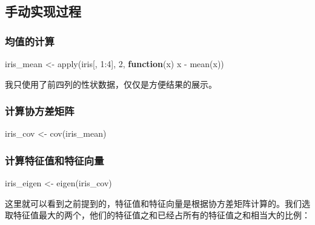 \documentclass[
]{krantz}
\makeatletter
\newenvironment{Shaded}{\begin{snugshade}}{\end{snugshade}}
\newcommand{\ControlFlowTok}[1]{\textcolor[rgb]{0.13,0.29,0.53}{\textbf{#1}}}
\newcommand{\DecValTok}[1]{\textcolor[rgb]{0.00,0.00,0.81}{#1}}
\newcommand{\FunctionTok}[1]{\textcolor[rgb]{0.00,0.00,0.00}{#1}}
\newcommand{\NormalTok}[1]{#1}
\newcommand{\OtherTok}[1]{\textcolor[rgb]{0.56,0.35,0.01}{#1}}
\newcommand{\SpecialCharTok}[1]{\textcolor[rgb]{0.00,0.00,0.00}{#1}}
\newenvironment{kframe}{%
\medskip{}
\setlength{\fboxsep}{.8em}
 \def\at@end@of@kframe{}%
 \ifinner\ifhmode%
  \def\at@end@of@kframe{\end{minipage}}%
  \begin{minipage}{\columnwidth}%
 \fi\fi%
 \def\FrameCommand##1{\hskip\@totalleftmargin \hskip-\fboxsep
 \colorbox{shadecolor}{##1}\hskip-\fboxsep
     \hskip-\linewidth \hskip-\@totalleftmargin \hskip\columnwidth}%
 \MakeFramed {\advance\hsize-\width
   \@totalleftmargin\z@ \linewidth\hsize
   \@setminipage}}%
 {\par\unskip\endMakeFramed%
 \at@end@of@kframe}
\renewenvironment{Shaded}{\begin{kframe}}{\end{kframe}}
\makeatother
\begin{document}
\hypertarget{man_pca}{%
\subsection{手动实现过程}\label{man_pca}}

\hypertarget{av_val}{%
\subsubsection{均值的计算}\label{av_val}}

\begin{Shaded}
\begin{Highlighting}[]
\NormalTok{iris\_mean }\OtherTok{\textless{}{-}} \FunctionTok{apply}\NormalTok{(iris[, }\DecValTok{1}\SpecialCharTok{:}\DecValTok{4}\NormalTok{], }\DecValTok{2}\NormalTok{, }\ControlFlowTok{function}\NormalTok{(x) x }\SpecialCharTok{{-}} \FunctionTok{mean}\NormalTok{(x))}
\end{Highlighting}
\end{Shaded}

我只使用了前四列的性状数据，仅仅是方便结果的展示。

\hypertarget{cov_val}{%
\subsubsection{计算协方差矩阵}\label{cov_val}}

\begin{Shaded}
\begin{Highlighting}[]
\NormalTok{iris\_cov }\OtherTok{\textless{}{-}} \FunctionTok{cov}\NormalTok{(iris\_mean)}
\end{Highlighting}
\end{Shaded}

\hypertarget{eig_val}{%
\subsubsection{计算特征值和特征向量}\label{eig_val}}

\begin{Shaded}
\begin{Highlighting}[]
\NormalTok{iris\_eigen }\OtherTok{\textless{}{-}} \FunctionTok{eigen}\NormalTok{(iris\_cov)}
\end{Highlighting}
\end{Shaded}

这里就可以看到之前提到的，特征值和特征向量是根据协方差矩阵计算的。我们选取特征值最大的两个，他们的特征值之和已经占所有的特征值之和相当大的比例：
\end{document}
